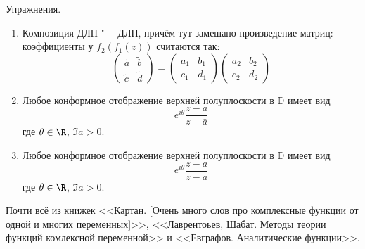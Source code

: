 Упражнения.
\begin{enumerate}
\item
	Композиция ДЛП "--- ДЛП, причём тут замешано произведение матриц: коэффициенты у $f_2(f_1(z))$ считаются так:
	\[
		\begin{pmatrix} \tilde a & \tilde b \\ \tilde c & \tilde d \end{pmatrix}
		= \begin{pmatrix} a_1 & b_1 \\ c_1 & d_1 \end{pmatrix}
		\begin{pmatrix} a_2 & b_2 \\ c_2 & d_2 \end{pmatrix}
	\]

\item
	Любое конформное отображение верхней полуплоскости в $\mathbb D$ имеет вид
	\[ e^{i\theta} \frac{z-a}{z-\bar a} \]
	где $\theta \in \R$, $\Im a > 0$.
\item
	Любое конформное отображение верхней полуплоскости в $\mathbb D$ имеет вид
	\[ e^{i\theta} \frac{z-a}{z-\bar a} \]
	где $\theta \in \R$, $\Im a > 0$.
\end{enumerate}

Почти всё из книжек
<<Картан. [Очень много слов про комплексные функции от одной и многих переменных]>>,
<<Лаврентоьев, Шабат. Методы теории функций комлексной переменной>>
и <<Евграфов. Аналитические функции>>.
